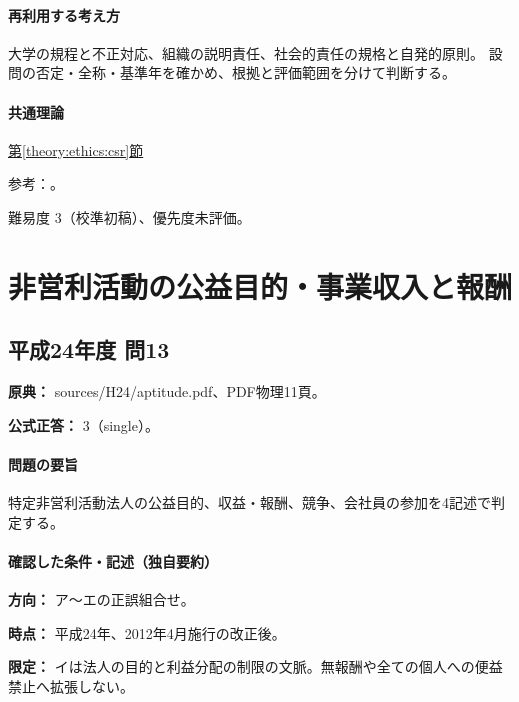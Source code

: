 \paragraph{再利用する考え方} 大学の規程と不正対応、組織の説明責任、社会的責任の規格と自発的原則。 設問の否定・全称・基準年を確かめ、根拠と評価範囲を分けて判断する。

\paragraph{共通理論} \hyperref[theory:ethics:csr]{第\ref*{theory:ethics:csr}節}

\par 参考：\cite{iso26000,eth54_globalcompact,eth54_university}。

\par 難易度 3（校準初稿）、優先度未評価。

\section{非営利活動の公益目的・事業収入と報酬}

\subsection{平成24年度 問13}
\label{q:h24-reg-apt-13}

\noindent\textbf{原典：} sources/H24/aptitude.pdf、PDF物理11頁。

\textbf{公式正答：} 3（single）。

\paragraph{問題の要旨} 特定非営利活動法人の公益目的、収益・報酬、競争、会社員の参加を4記述で判定する。

\paragraph{確認した条件・記述（独自要約）}\mbox{}\par

\noindent\textbf{方向：} ア〜エの正誤組合せ。\par

\noindent\textbf{時点：} 平成24年、2012年4月施行の改正後。\par

\noindent\textbf{限定：} イは法人の目的と利益分配の制限の文脈。無報酬や全ての個人への便益禁止へ拡張しない。\par

